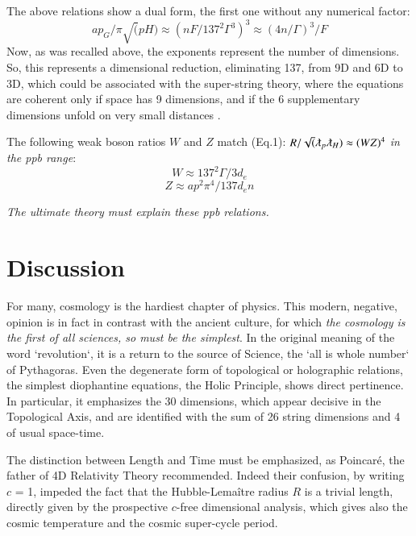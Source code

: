 \documentclass[twoside,draft]{article}
\begin{document}
\begin{sloppypar}
The above relations show a dual form, the first one without any numerical factor:
\begin{equation}
ap_{G} / \pi \sqrt(pH) \approx (n F/137^{2} \Gamma^{3} )^{3} \approx (4n/ \Gamma)^{3}/F
\end{equation}
Now, as was recalled above, the exponents represent the number of
dimensions. So, this represents a dimensional reduction, eliminating 137, from 9D and 6D to
3D, which could be associated with the super-string theory, where the equations are coherent only if space
has 9 dimensions, and if the 6 supplementary dimensions unfold on very small distances \cite{Polchinski}.


The following weak boson ratios $W$ and $Z$ match (Eq.1):
$R/\sqrt(\lambdabar_{p} \lambdabar_{H} ) \approx (WZ)^{4}$
\textit{in the ppb range}: 
\begin{equation}
W \approx 137^{2} \Gamma / 3d_{e}
\end{equation}
\begin{equation}
Z \approx ap^{2} \pi^{4} / 137 d_{e} n
\end{equation}


\textit{The ultimate theory must explain these ppb relations.}


\section {Discussion}

For many, cosmology is the hardiest chapter of physics. This modern, negative, opinion is in fact in contrast with the ancient culture, for which \textit{the cosmology is the first of all sciences, so must be the simplest}. In the original meaning of the word `revolution`, it is a return to the source of Science, the `all is whole number` of Pythagoras. Even the degenerate form of topological or holographic relations, the simplest diophantine equations, the Holic Principle, shows direct pertinence. In particular, it emphasizes the 30 dimensions, which appear decisive in the Topological Axis, and are identified with the sum of 26 string dimensions and 4 of usual space-time.

The distinction between Length and Time must be emphasized, as
Poincar\'{e}, the father of 4D Relativity Theory recommended. Indeed their confusion, by writing $c$ =
1, impeded the fact that the Hubble-Lema\^{i}tre radius $R$ is a trivial length, directly given by the prospective $c$-free dimensional analysis, which gives also the cosmic temperature and the cosmic super-cycle period.


\end{sloppypar}
\end{document}
